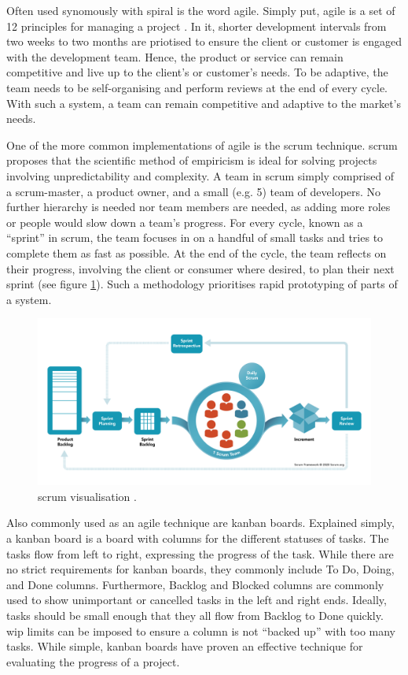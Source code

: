 \documentclass[11pt]{article}
\begin{document}
Often used synomously with \gls{spiral} is the word \gls{agile}. Simply put, \gls{agile} is a set of 12 principles for managing a project \cite{agile-manifesto}. In it, shorter development intervals from two weeks to two months are priotised to ensure the client or customer is engaged with the development team. Hence, the product or service can remain competitive and live up to the client's or customer's needs. To be adaptive, the team needs to be self-organising and perform reviews at the end of every cycle. With such a system, a team can remain competitive and adaptive to the market's needs.

One of the more common implementations of agile is the \Gls{scrum} technique. \Gls{scrum} proposes that the scientific method of empiricism is ideal for solving projects involving unpredictability and complexity. A team in \Gls{scrum} simply comprised of a \Gls{scrum-master}, a product owner, and a small (e.g. 5) team of developers. No further hierarchy is needed nor team members are needed, as adding more roles or people would slow down a team's progress. For every cycle, known as a ``\gls{sprint}'' in \Gls{scrum}, the team focuses in on a handful of small tasks and tries to complete them as fast as possible. At the end of the cycle, the team reflects on their progress, involving the client or consumer where desired, to plan their next \gls{sprint} (see figure \ref{fig:scrum}). Such a methodology prioritises rapid prototyping of parts of a system.

\begin{figure}[h!]
    \centering
    \includegraphics[width=\textwidth]{figures/scrum-framework.png}
    \caption{\Gls{scrum} visualisation \cite{what-is-scrum}.}
    \label{fig:scrum}
\end{figure}

Also commonly used as an \gls{agile} technique are \Gls{kanban} boards. Explained simply, a \Gls{kanban} board is a board with columns for the different statuses of tasks. The tasks flow from left to right, expressing the progress of the task. While there are no strict requirements for \Gls{kanban} boards, they commonly include To Do, Doing, and Done columns. Furthermore, Backlog and Blocked columns are commonly used to show unimportant or cancelled tasks in the left and right ends. Ideally, tasks should be small enough that they all flow from Backlog to Done quickly. \acrfull{wip} limits can be imposed to ensure a column is not ``backed up'' with too many tasks. While simple, \Gls{kanban} boards have proven an effective technique for evaluating the progress of a project.
\end{document}
